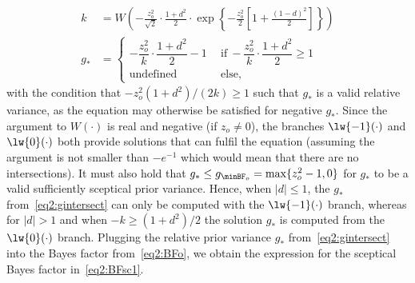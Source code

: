 \begin{subappendices}
\begin{align}
  \label{eq2:gintersect}
  k &= W\left(-\frac{z_{o}^{2}}{\sqrt{2}} \cdot \frac{1 + d^{2}}{2} \cdot
      \exp\left\{-\frac{z_o^2}{2} \left[1 + \frac{(1 - d)^2}{2}\right]\right\}\right)
  \nonumber \\
  g_* &=
  \begin{cases}
    -\dfrac{z_o^2}{k}\cdot \dfrac{1 + d^{2}}{2} - 1 & ~~ \text{if} ~
    -\dfrac{z_o^2}{k}\cdot\dfrac{1 + d^{2}}{2} \geq 1 \\
    \text{undefined} & ~~ \text{else},
  \end{cases}
\end{align}
with the condition that $-z_o^2(1 + d^{2})/(2k) \geq 1$ such that $g_*$ is a
valid relative variance, as the equation may otherwise be satisfied for negative
$g_*$. Since the argument to $W(\cdot)$ is real and negative (if $z_{o}\neq 0$),
the branches $\lw{-1}(\cdot)$ and $\lw{0}(\cdot)$ both provide solutions that
can fulfil the equation (assuming the argument is not smaller than $-e^{-1}$
which would mean that there are no intersections). It must also hold that
$g_{*} \leq g_{\minBF_{o}} = \max\{z_{o}^{2} - 1, 0\}$ for $g_{*}$ to be a valid
sufficiently sceptical prior variance. Hence, when $|d| \leq 1$, the $g_{*}$
from~\eqref{eq2:gintersect} can only be computed with the $\lw{-1}(\cdot)$
branch, whereas for $|d| > 1$ and when $-k \geq (1 + d^{2})/2$ the solution
$g_{*}$ is computed from the $\lw{0}(\cdot)$ branch. Plugging the relative prior
variance $g_{*}$ from~\eqref{eq2:gintersect} into the Bayes factor
from~\eqref{eq2:BFo}, we obtain the expression for the sceptical Bayes factor
in~\eqref{eq2:BFsc1}.



\end{subappendices}
